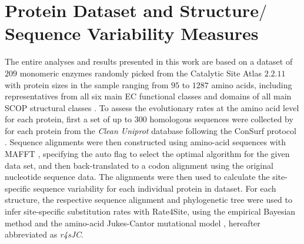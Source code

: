 \documentclass[11pt]{article}
\begin{document}


\section{Protein Dataset and Structure$/$Sequence Variability Measures}
\label{sec:methods}

    The entire analyses and results presented in this work are based on a dataset of $209$ monomeric enzymes \citep[e.g.,][]{yeh_site-specific_2014, echave_relationship_2014} randomly picked from the Catalytic Site Atlas $2.2.11$ \citep[][]{porter_catalytic_2004} with protein sizes in the sample ranging from $95$ to $1287$ amino acids, including representatives from all six main EC functional classes \citep[][]{webb_enzyme_1992} and domains of all main SCOP structural classes \citep[][]{murzin_scop:_1995}. To assess the evolutionary rates at the amino acid level for each protein, first a set of up to $300$ homologous sequences were collected by \citet{yeh_site-specific_2014} for each protein from the {\it Clean Uniprot} database following the ConSurf protocol \citep[][]{goldenberg_consurf-db:_2009, ashkenazy_consurf_2010}. Sequence alignments were then constructed using amino-acid sequences with MAFFT \citep[][]{katoh_mafft_2005}, specifying the auto flag to select the optimal algorithm for the given data set, and then back-translated to a codon alignment using the original nucleotide sequence data. The alignments were then used to calculate the site-specific sequence variability for each individual protein in dataset. For each structure, the respective sequence alignment and phylogenetic tree were used to infer site-specific substitution rates with Rate4Site, using the empirical Bayesian method and the amino-acid Jukes-Cantor mutational model \citep[][]{mayrose_comparison_2004}, hereafter abbreviated as {\it r4sJC}. \\
\end{document}

